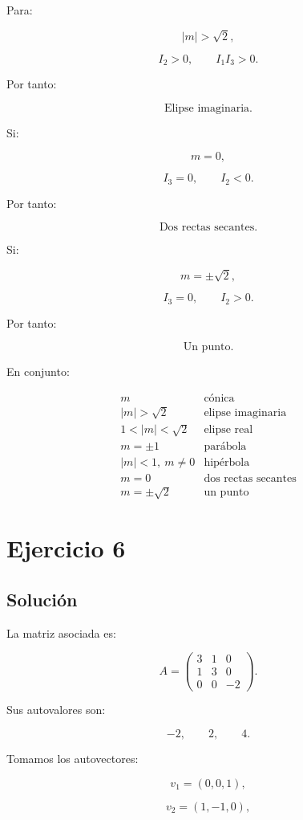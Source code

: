 \documentclass[11pt,a4paper]{article}
\begin{document}
Para:

\[
|m|>\sqrt2,
\]

\[
I_2>0,
\qquad
I_1I_3>0.
\]

Por tanto:

\[
\boxed{\text{Elipse imaginaria}.}
\]

Si:

\[
m=0,
\]

\[
I_3=0,
\qquad
I_2<0.
\]

Por tanto:

\[
\boxed{\text{Dos rectas secantes}.}
\]

Si:

\[
m=\pm\sqrt2,
\]

\[
I_3=0,
\qquad
I_2>0.
\]

Por tanto:

\[
\boxed{\text{Un punto}.}
\]

En conjunto:

\[
\boxed{
\begin{array}{c|c}
m & \text{cónica}\\
\hline
|m|>\sqrt2 & \text{elipse imaginaria}\\
1<|m|<\sqrt2 & \text{elipse real}\\
m=\pm1 & \text{parábola}\\
|m|<1,\ m\neq0 & \text{hipérbola}\\
m=0 & \text{dos rectas secantes}\\
m=\pm\sqrt2 & \text{un punto}
\end{array}
}
\]

\section{Ejercicio 6}
\subsection{Solución}

La matriz asociada es:

\[
A=
\begin{pmatrix}
3&1&0\\
1&3&0\\
0&0&-2
\end{pmatrix}.
\]

Sus autovalores son:

\[
-2,\qquad2,\qquad4.
\]

Tomamos los autovectores:

\[
v_1=(0,0,1),
\]

\[
v_2=(1,-1,0),
\]
\end{document}
